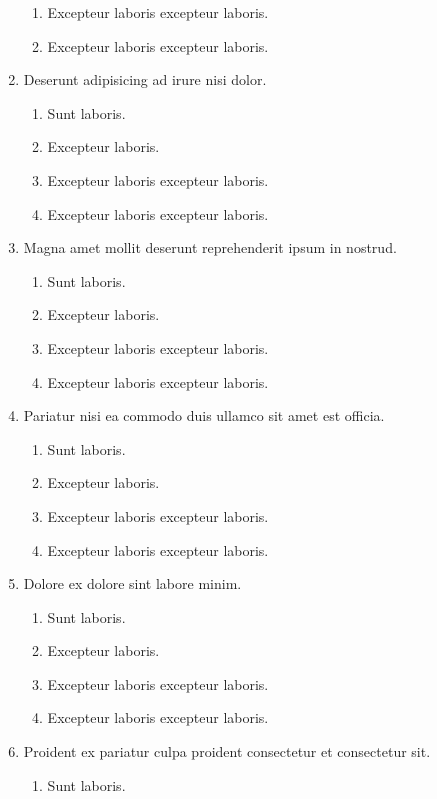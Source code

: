 \documentclass[a4paper,12pt]{article}
\begin{document}
\begin{enumerate}[label=\textbf{\arabic*.}]
\begin{enumerate}
    \item Excepteur laboris excepteur laboris.
    \item Excepteur laboris excepteur laboris.
  \end{enumerate}
  \item Deserunt adipisicing ad irure nisi dolor.
  \begin{enumerate}
    \item Sunt laboris.
    \item Excepteur laboris.
    \item Excepteur laboris excepteur laboris.
    \item Excepteur laboris excepteur laboris.
  \end{enumerate}
  \item Magna amet mollit deserunt reprehenderit ipsum in nostrud.
  \begin{enumerate}
    \item Sunt laboris.
    \item Excepteur laboris.
    \item Excepteur laboris excepteur laboris.
    \item Excepteur laboris excepteur laboris.
  \end{enumerate}
  \item Pariatur nisi ea commodo duis ullamco sit amet est officia.
  \begin{enumerate}
    \item Sunt laboris.
    \item Excepteur laboris.
    \item Excepteur laboris excepteur laboris.
    \item Excepteur laboris excepteur laboris.
  \end{enumerate}
  \item Dolore ex dolore sint labore minim.
  \begin{enumerate}
    \item Sunt laboris.
    \item Excepteur laboris.
    \item Excepteur laboris excepteur laboris.
    \item Excepteur laboris excepteur laboris.
  \end{enumerate}
  \item Proident ex pariatur culpa proident consectetur et consectetur sit.
  \begin{enumerate}
    \item Sunt laboris.

\end{enumerate}
\end{enumerate}
\end{document}
